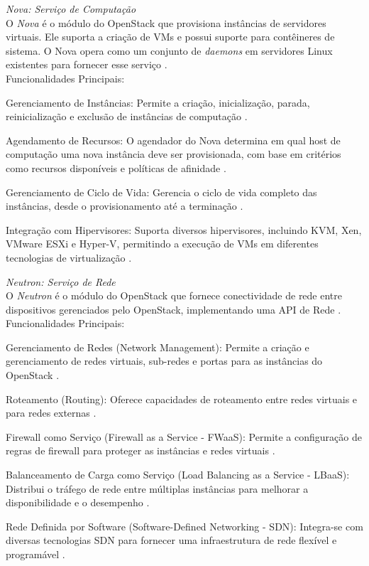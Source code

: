 \begin{description}
    \item \emph{Nova: Serviço de Computação}\\
    O \textit{Nova} é o módulo do OpenStack que provisiona instâncias de servidores virtuais. Ele suporta a criação de VMs e possui suporte para contêineres de sistema. O Nova opera como um conjunto de \textit{daemons} em servidores Linux existentes para fornecer esse serviço \cite{openstacknova}.\\
    Funcionalidades Principais:
    \begin{description}
        \item Gerenciamento de Instâncias: Permite a criação, inicialização, parada, reinicialização e exclusão de instâncias de computação \cite{openstacknova}.
        \item Agendamento de Recursos: O agendador do Nova determina em qual host de computação uma nova instância deve ser provisionada, com base em critérios como recursos disponíveis e políticas de afinidade \cite{openstacknova}.
        \item Gerenciamento de Ciclo de Vida: Gerencia o ciclo de vida completo das instâncias, desde o provisionamento até a terminação \cite{openstacknova}.
        \item Integração com Hipervisores: Suporta diversos hipervisores, incluindo KVM, Xen, VMware ESXi e Hyper-V, permitindo a execução de VMs em diferentes tecnologias de virtualização \cite{openstacknova}.
    \end{description}

    \item \emph{Neutron: Serviço de Rede}\\
    O \textit{Neutron} é o módulo do OpenStack que fornece conectividade de rede entre dispositivos gerenciados pelo OpenStack, implementando uma API de Rede \cite{openstackneutron}.\\
    Funcionalidades Principais:
    \begin{description}
        \item Gerenciamento de Redes (Network Management): Permite a criação e gerenciamento de redes virtuais, sub-redes e portas para as instâncias do OpenStack \cite{openstackneutron}.
        \item Roteamento (Routing): Oferece capacidades de roteamento entre redes virtuais e para redes externas \cite{openstackneutron}.
        \item Firewall como Serviço (Firewall as a Service - FWaaS): Permite a configuração de regras de firewall para proteger as instâncias e redes virtuais \cite{openstackneutron}.
        \item Balanceamento de Carga como Serviço (Load Balancing as a Service - LBaaS): Distribui o tráfego de rede entre múltiplas instâncias para melhorar a disponibilidade e o desempenho \cite{openstackneutron}.
        \item Rede Definida por Software (Software-Defined Networking - SDN): Integra-se com diversas tecnologias SDN para fornecer uma infraestrutura de rede flexível e programável \cite{openstackneutron}.
    \end{description}


\end{description}
